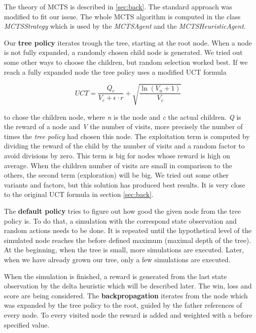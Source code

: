 The theory of \ac{MCTS} is described in \cref{sec:back}. The standard approach was modified to fit our issue. The whole \ac{MCTS} algorithm is computed in the class \textit{MCTSStrategy} which is used by the \textit{MCTSAgent} and the \textit{MCTSHeuristicAgent}.

Our \textbf{tree policy} iterates trough the tree, starting at the root node. When a node is not fully expanded, a randomly chosen child node is generated. We tried out some other ways to choose the children, but random selection worked best. If we reach a fully expanded node the tree policy uses a modified \ac{UCT} formula

\begin{equation}
 	UCT = \frac{Q_c}{V_c + \epsilon \cdot r} + \sqrt{\frac{\ln{(V_n +1)}}{V_c}}
\end{equation} 

to chose the children node, where \textit{n} is the node and \textit{c} the actual children. \textit{Q} is the reward of a node and \textit{V} the number of visits, more precisely the number of times the \textit{tree policy} had chosen this node. The exploitation term is computed by dividing the reward of the child by the number of visits and a random factor to avoid divisions by zero. This term is big for nodes whose reward is high on average.
When the children number of visits are small in comparison to the others, the second term (exploration) will be big. We tried out some other variants and factors, but this solution has produced best results. It is very close to the original \ac{UCT} formula in section \ref{sec:back}.

The \textbf{default policy} tries to figure out how good the given node from the tree policy is. To do that, a simulation with the correspond state observation and random actions needs to be done. It is repeated until the hypothetical level of the simulated node reaches the before defined maximum (maximal depth of the tree). At the beginning, when the tree is small, more simulations are executed. Later, when we have already grown our tree, only a few simulations are executed.

When the simulation is finished, a reward is generated from the last state observation by the delta heuristic which will be described later. The win, loss and score are being considered.
The \textbf{backpropagation} iterates from the node which was expanded by the tree policy to the root, guided by the father references of every node. To every visited node the reward is added and weighted with a before specified value.



